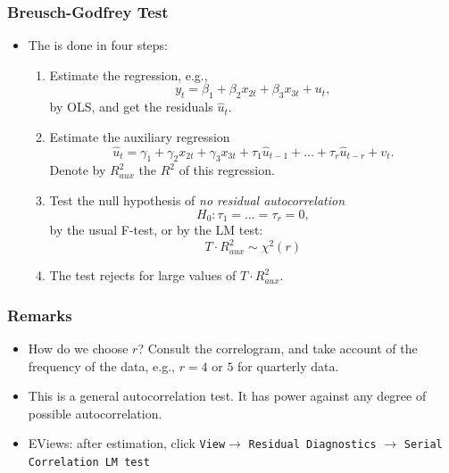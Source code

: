 \begin{frame}
\frametitle{Breusch-Godfrey Test}

\begin{itemize}

\item The  is done in four steps:


\begin{enumerate}
\item Estimate the regression, e.g.,%
\begin{equation*}
y_{t}=\beta _{1}+\beta _{2}x_{2t}+\beta _{3}x_{3t}+u_{t},
\end{equation*}%
by OLS, and get the residuals $\widehat{u}_{t}$.

\item Estimate the auxiliary regression%
\begin{equation*}
\widehat{u}_{t}=\gamma _{1}+\gamma _{2}x_{2t}+\gamma _{3}x_{3t}+\tau _{1}%
\widehat{u}_{t-1}+\ldots +\tau _{r}\widehat{u}_{t-r}+v_{t}.
\end{equation*}%
Denote by $R_{aux}^{2}$ the $R^{2}$ of this regression.


\item Test the null hypothesis of \emph{\color{red}no residual
autocorrelation}%
\begin{equation*}
H_{0}:\tau _{1}=\ldots =\tau _{r}=0,
\end{equation*}%
by the usual F-test, or by the LM test:%
\begin{equation*}
 T \cdot R_{aux}^{2}\sim \chi ^{2}\left( r\right)
\end{equation*}

\item The test rejects for large values of $T \cdot R_{aux}^{2}$.
\end{enumerate}
\end{itemize}
\end{frame}
\begin{frame}
\frametitle{Remarks}
\begin{itemize}

\item How do we choose $r$? Consult the correlogram, and take account of the
frequency of the data, e.g., $r=4$ or $5$ for quarterly data.

\item This is a general autocorrelation test. It has power against any
degree of possible autocorrelation.

\item EViews: after estimation, click \texttt{View}$\rightarrow$ \texttt{Residual Diagnostics} $\rightarrow$ \texttt{Serial Correlation LM test}
\end{itemize}
\end{frame}


